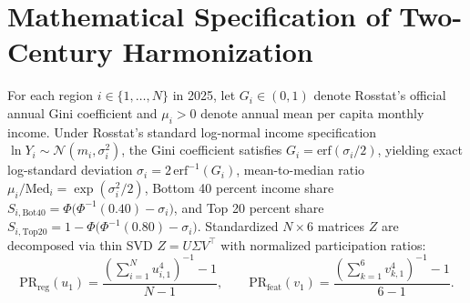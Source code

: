 \documentclass[11pt,a4paper]{article}
\begin{document}
\appendix
\section{Mathematical Specification of Two-Century Harmonization}
For each region $i \in \{1,\dots,N\}$ in 2025, let $G_i \in (0,1)$ denote Rosstat's official annual Gini coefficient and $\mu_i > 0$ denote annual mean per capita monthly income. Under Rosstat's standard log-normal income specification $\ln Y_i \sim \mathcal{N}(m_i, \sigma_i^2)$, the Gini coefficient satisfies $G_i = \mathrm{erf}(\sigma_i / 2)$, yielding exact log-standard deviation $\sigma_i = 2\,\mathrm{erf}^{-1}(G_i)$, mean-to-median ratio $\mu_i / \mathrm{Med}_i = \exp(\sigma_i^2/2)$, Bottom 40 percent income share $S_{i,\mathrm{Bot40}} = \Phi\big(\Phi^{-1}(0.40) - \sigma_i\big)$, and Top 20 percent share $S_{i,\mathrm{Top20}} = 1 - \Phi\big(\Phi^{-1}(0.80) - \sigma_i\big)$. Standardized $N \times 6$ matrices $Z$ are decomposed via thin SVD $Z = U \Sigma V^\top$ with normalized participation ratios:
\begin{equation}
\mathrm{PR}_{\mathrm{reg}}(u_1) = \frac{\left(\sum_{i=1}^N u_{i,1}^4\right)^{-1} - 1}{N - 1}, \qquad
\mathrm{PR}_{\mathrm{feat}}(v_1) = \frac{\left(\sum_{k=1}^6 v_{k,1}^4\right)^{-1} - 1}{6 - 1}.
\end{equation}
\end{document}
